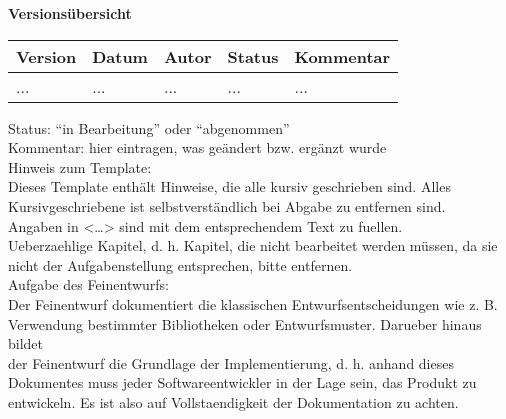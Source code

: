 
{\textbf{Versionsübersicht}}\\[2ex]

\begin{longtable}{|m{1.78cm}|m{1.59cm}|m{2.86cm}|m{1.9cm}|m{5.25cm}|}

  \hline                                              %

  \textbf{Version}  &    \textbf{Datum}  &    \textbf{Autor}  &
  \textbf{Status}   &    \textbf{Kommentar}       \\  %
  \hline                                              %


  ...    &    ...    &    ...    &    ...    &    ...\\      %
  \hline                                                     %

\end{longtable}
Status: "`in Bearbeitung"' oder "`abgenommen"'\\
Kommentar: hier eintragen, was geändert bzw. ergänzt wurde\\

Hinweis zum Template:\\
Dieses Template enthält Hinweise, die alle kursiv geschrieben sind. Alles\\
Kursivgeschriebene ist selbstverständlich bei Abgabe zu entfernen sind.\\
Angaben in <…> sind mit dem entsprechendem Text zu fuellen.\\
Ueberzaehlige Kapitel, d. h. Kapitel, die nicht bearbeitet werden müssen, da
sie\\ nicht der Aufgabenstellung entsprechen, bitte entfernen.\\

Aufgabe des Feinentwurfs:\\
Der Feinentwurf dokumentiert die klassischen Entwurfsentscheidungen wie z. B.\\
Verwendung bestimmter Bibliotheken oder Entwurfsmuster. Darueber hinaus
bildet\\ der Feinentwurf die Grundlage der Implementierung, d. h. anhand
dieses\\ Dokumentes muss jeder Softwareentwickler in der Lage sein, das Produkt
zu\\ entwickeln. Es ist also auf Vollstaendigkeit der Dokumentation zu
achten.\\


